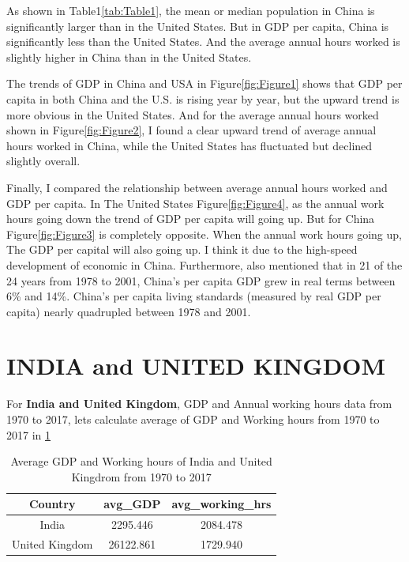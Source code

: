 \documentclass[11pt,a4paper,]{article}
\begin{document}
As shown in Table1\ref{tab:Table1}, the mean or median population in China is significantly larger than in the United States. But in GDP per capita, China is significantly less than the United States. And the average annual hours worked is slightly higher in China than in the United States.

The trends of GDP in China and USA in Figure\ref{fig:Figure1} shows that GDP per capita in both China and the U.S. is rising year by year, but the upward trend is more obvious in the United States. And for the average annual hours worked shown in Figure\ref{fig:Figure2}, I found a clear upward trend of average annual hours worked in China, while the United States has fluctuated but declined slightly overall.

Finally, I compared the relationship between average annual hours worked and GDP per capita. In The United States Figure\ref{fig:Figure4}, as the annual work hours going down the trend of GDP per capita will going up. But for China Figure\ref{fig:Figure3} is completely opposite. When the annual work hours going up, The GDP per capital will also going up. I think it due to the high-speed development of economic in China. Furthermore, \textcite{BANISTER200521} also mentioned that in 21 of the 24 years from 1978 to 2001, China's per capita GDP grew in real terms between 6\% and 14\%. China's per capita living standards (measured by real GDP per capita) nearly quadrupled between 1978 and 2001.

\hypertarget{india-and-united-kingdom}{%
\section{INDIA and UNITED KINGDOM}\label{india-and-united-kingdom}}

For \textbf{India and United Kingdom}, GDP and Annual working hours data from 1970 to 2017, lets calculate average of GDP and Working hours from 1970 to 2017 in \ref{tab:TableAvg}

\begin{table}[!h]

\caption{\label{tab:TableAvg}Average GDP and Working hours of India and United Kingdrom from 1970 to 2017}
\centering
\begin{tabular}[t]{c|c|c}
\hline
Country & avg\_GDP & avg\_working\_hrs\\
\hline
India & 2295.446 & 2084.478\\
\hline
United Kingdom & 26122.861 & 1729.940\\
\hline
\end{tabular}
\end{table}
\end{document}
